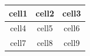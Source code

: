 
\begin{tabular}{ |c|c|c| }
    \hline
    \textbf{cell1} & cell2 & cell3 \\
    \hline
    cell4 & cell5 & cell6 \\
    \hline
    cell7 & cell8 & cell9 \\
    \hline
\end{tabular}
